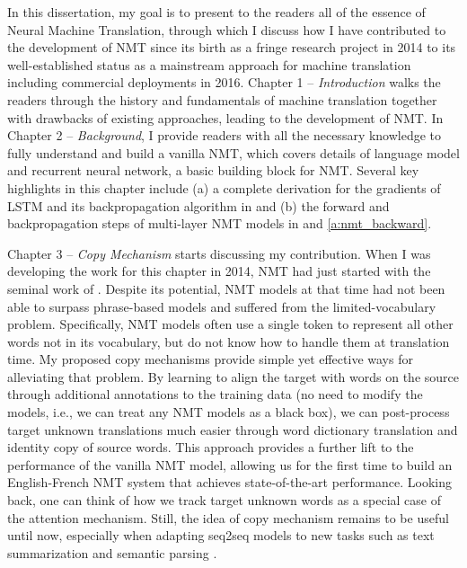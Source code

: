 In this dissertation, my goal is to present to the readers all of the essence of Neural Machine Translation, through which I discuss how I have contributed to the development of NMT since its birth as a fringe research project in 2014 to its well-established status as a mainstream approach for machine translation including commercial deployments in 2016. Chapter 1 -- {\it Introduction} walks the readers through the history and fundamentals of machine translation together with drawbacks of existing approaches, leading to the development of NMT. In Chapter 2 -- {\it Background}, I provide readers with all the necessary knowledge to fully understand and build a vanilla NMT, which covers details of language model and recurrent neural network, a basic building block for NMT. Several key highlights in this chapter include (a) a complete derivation for the gradients of LSTM and its backpropagation algorithm in  and (b) the forward and backpropagation steps of multi-layer NMT models in  and \ref{a:nmt_backward}. 

Chapter 3 -- {\it Copy Mechanism} starts discussing my contribution. When I was developing the work for this chapter in 2014,
NMT had just started with the seminal work of . Despite its potential, NMT models at that time had not been able to surpass phrase-based models and suffered from the limited-vocabulary problem. Specifically, NMT models often use a single \unk{} token to represent all other words not in its vocabulary, but do not know how to handle them at translation time. My proposed copy mechanisms provide simple yet effective ways for alleviating that problem. By learning to align the target \unk{} with words on the source through additional annotations to the training data (no need to modify the models, i.e., we can treat any NMT models as a black box), we can post-process target unknown translations much easier through word dictionary translation and identity copy of source words. This approach provides a further lift to the performance of the vanilla NMT model, allowing us for the first time to build an English-French NMT system that achieves state-of-the-art performance. Looking back, one can think of how we track target unknown words as a special case of the attention mechanism.
Still, the idea of copy mechanism remains to be useful until now, especially when adapting seq2seq models to new tasks such as text summarization \cite{gu16,gulcehre16} and semantic parsing \cite{jia16}.

